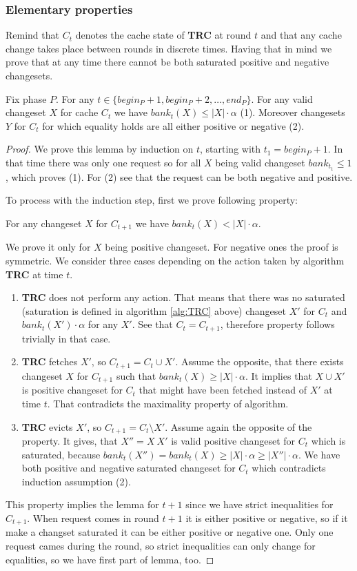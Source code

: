 \subsubsection{Elementary properties}
Remind that $C_t$ denotes the cache state of \textbf{TRC} at round $t$ and that 
any cache change takes place between rounds in discrete times. 
Having that in mind we prove that at any time there cannot be both saturated 
positive and negative changesets.
\begin{lemma}
\label{thm:lemma1}
 Fix phase $P$. For any $t \in \{begin_P +1, begin_P + 2, \ldots, end_P\}$. 
For any valid changeset $X$ for cache $C_t$ we have $bank_t(X) \leq |X| \cdot 
\alpha$ (1). Moreover changesets $Y$ for $C_t$ for which equality holds are 
all either positive or negative (2).
\end{lemma}
\begin{proof}
We prove this lemma by induction on $t$, starting with $t_1 = begin_P +1$. In 
that time there was only one request so for all $X$ being valid changeset 
$bank_{t_1} \leq 1$, which proves (1). For (2) see that the request can be both 
negative and positive.

To process with the induction step, first we prove following property:
\begin{property}
For any changeset $X$ for $C_{t+1}$ we have $bank_t(X) < |X| \cdot \alpha$.
\end{property}
We prove it only for $X$ being positive changeset. For negative ones the proof 
is symmetric. We consider three cases depending on the action taken by 
algorithm \textbf{TRC} at time $t$.
\begin{enumerate}
 \item \textbf{TRC} does not perform any action. That means that there was no 
saturated (saturation is defined in algorithm \ref{alg:TRC} above) changeset 
$X'$ for $C_t$ and $bank_t(X') \cdot \alpha$ for any $X'$. See that $C_t = 
C_{t+1}$, therefore property follows trivially in that case.
  \item \textbf{TRC} fetches $X'$, so $C_{t+1} = C_t \cup X'$. Assume the 
opposite, that there exists changeset $X$ for $C_{t+1}$ such that $bank_t(X) 
\geq |X| \cdot \alpha$. It implies that $X \cup X'$ is positive changeset for 
$C_t$ that might have been fetched instead of $X'$ at time $t$. That 
contradicts the maximality property of algorithm.
  \item \textbf{TRC} evicts $X'$, so $C_{t+1}  = C_t \setminus X'$. Assume 
again the opposite of the property. It gives, that $X'' = X \ X'$ is valid 
positive changeset for $C_t$ which is saturated, because $bank_t(X'') = 
bank_t(X) \geq |X| \cdot \alpha \geq |X''| \cdot \alpha$. We have both positive 
and negative saturated changeset for $C_t$ which contradicts induction 
assumption (2).
\end{enumerate}
This property implies the lemma for $t+1$ since we have strict inequalities for 
$C_{t+1}$. When request comes in round $t+1$ it is either positive or negative, 
so if it make a changset saturated it can be either positive or negative one. 
Only one request cames during the round, so strict inequalities can only change 
for equalities, so we have first part of lemma, too.
\end{proof}
